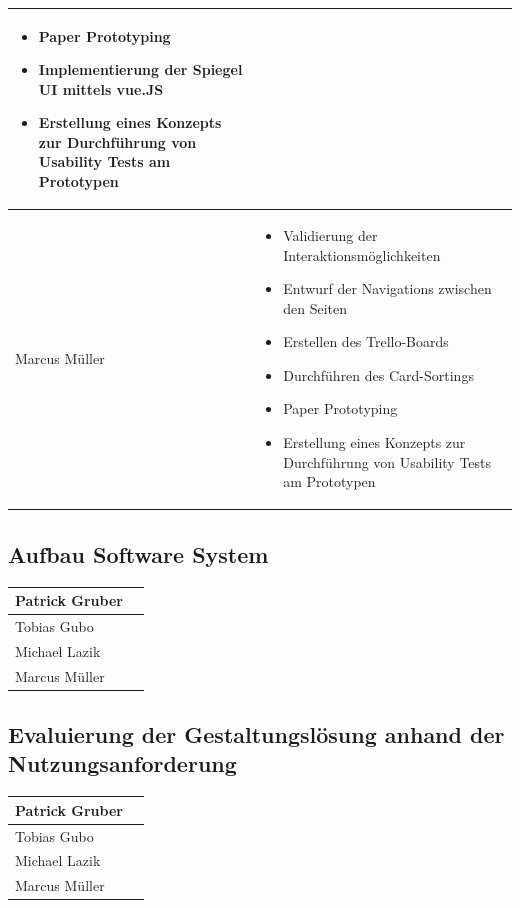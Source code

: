 \documentclass[12pt, a4paper]{scrartcl}
\begin{document}
\begin{tabularx}{0.95\textwidth}{|l|X|}
\begin{itemize}
			\item Paper Prototyping
			\item Implementierung der Spiegel UI mittels vue.JS
			\item Erstellung eines Konzepts zur Durchführung von Usability Tests am Prototypen
		\end{itemize}\\
		\hline
		Marcus Müller &  \begin{itemize}
			\setlength{\itemsep}{-0.6em}
			\item  Validierung der Interaktionsmöglichkeiten
			\item  Entwurf der Navigations zwischen den Seiten
			\item Erstellen des Trello-Boards
			\item Durchführen des Card-Sortings
			\item Paper Prototyping
			\item Erstellung eines Konzepts zur Durchführung von Usability Tests am Prototypen
		\end{itemize}\\
		\hline
	\end{tabularx}

	\subsection*{Aufbau Software System}
	\begin{tabularx}{0.95\textwidth}{|l|X|}
		\hline
		Patrick Gruber & \\
		\hline
		Tobias Gubo & \\
		\hline
		Michael Lazik & \\
		\hline
		Marcus Müller & \\
		\hline
	\end{tabularx}

	\subsection*{Evaluierung der Gestaltungslösung anhand der Nutzungsanforderung}
	\begin{tabularx}{0.95\textwidth}{|l|X|}
		\hline
		Patrick Gruber & \\
		\hline
		Tobias Gubo & \\
		\hline
		Michael Lazik & \\
		\hline
		Marcus Müller & \\
		\hline
	\end{tabularx}
	
\end{document}
